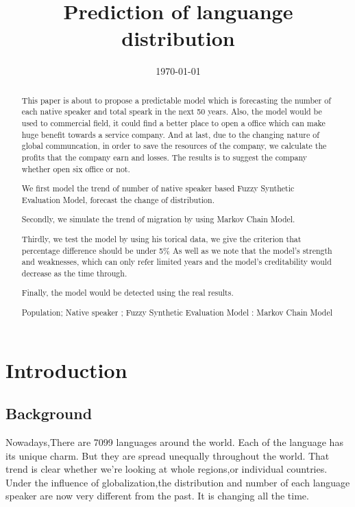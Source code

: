 \documentclass{mcmthesis}
\title{Prediction of languange distribution}
\date{\today}
\begin{document}
\begin{abstract}
\qquad This paper is about to propose a predictable model which is forecasting the number of each native speaker and total speark in the next 50 years.
Also, the model would be used to commercial field, it could find a better place to open a office which can make huge benefit towards a service company.
And at last, due to the changing nature of global communcation, in order to save the resources of the company, we calculate the profits that the company earn and losses.
The results is to suggest the company whether open six office or not.


We first model the trend of number of native speaker based Fuzzy Synthetic Evaluation Model, forecast the change of distribution.

Secondly, we simulate the trend of migration by using Markov Chain Model. 

Thirdly, we test the model by using his torical data, we give the criterion that percentage difference should be under 5\%
As well as we note that the model's strength and weaknesses, which can only refer limited years and the model's creditability would decrease as the time through.


Finally, the model would be detected using the real results.

\begin{keywords}
Population; Native speaker ; Fuzzy Synthetic Evaluation Model : Markov Chain Model
\end{keywords}
\end{abstract}
\maketitle
\tableofcontents
\section{Introduction}
\subsection{Background}
\qquad Nowadays,There are 7099 languages around the world. Each of the language has its unique charm.
But they are spread unequally throughout the world. 
That trend is clear whether we’re looking at whole regions,or individual countries.
Under the influence of globalization,the distribution and number of each language speaker are now very different from the past. 
It is changing all the time.
\cite{No-of-languages}
\end{document}
